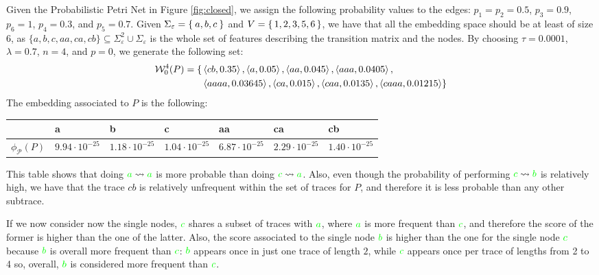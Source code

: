 \begin{example}
Given the Probabilistic Petri Net in Figure \ref{fig:closed}, we assign the following probability values to the edges: $p_1=p_2=0.5$, $p_3=0.9$, $p_6=1$, $p_4=0.3$, and $p_5=0.7$. Given $\Sigma_\varepsilon=\Set{a,b,c}$ and $V=\set{1,2,3,5,6}$, we have that all the embedding space should be at least of size $6$, as $\{a,b,c,aa,ca,cb\}\subseteq \Sigma_\varepsilon^2\cup\Sigma_\varepsilon$ is the whole set of features describing the transition matrix and the nodes. By choosing $\tau=0.0001$, $\lambda=0.7$, $n=4$, and $p=0$, we generate the following set:
$$\begin{aligned}
\mathcal{W}_0^4(P)=\{&\braket{cb,0.35},\braket{a,0.05},\braket{aa,0.045},\braket{aaa,0.0405},\\
&\braket{aaaa,0.03645},\braket{ca,0.015},\braket{caa,0.0135},\braket{caaa,0.01215}\}\\
\end{aligned}$$
The embedding associated to $P$ is the following:
\begin{center}
		\begin{tabular}{l|l|l|l|l|l|l|}
		\toprule
		& a    & b                                                   & c    & aa   & ca   & cb   \\
		\midrule
		$\phi_{\mathcal{P}}(P)$ & $9.94\cdot10^{-25}$ & $1.18\cdot 10^{-25}$ & $1.04\cdot10^{-25}$ & $6.87\cdot 10^{-25}$ & $2.29\cdot10^{-25}$ & $1.40\cdot10^{-25}$\\
		\bottomrule
	\end{tabular}
\end{center}
This table shows that doing ${\color{green}a}\rightsquigarrow{\color{green}a}$ is more probable than doing  ${\color{green}c}\rightsquigarrow{\color{green}a}$. Also, even though the probability of performing  ${\color{green}c}\rightsquigarrow{\color{green}b}$ is relatively high, we have that the trace $cb$ is relatively unfrequent within the set of traces for $P$, and therefore it is less probable than any other subtrace. 

If we now consider now the single nodes, $\color{green}c$ shares a subset of traces with $\color{green}a$, where $\color{green}a$ is more frequent than $\color{green}c$, and therefore the score of the former is higher than the one of the latter. Also, the score associated to the single node $\color{green}b$ is higher than the one for the single node $\color{green}c$ because $\color{green}b$ is overall more frequent than $\color{green}c$:  $\color{green}b$ appears once in just one trace of length $2$, while $\color{green}c$ appears once per trace of lengths from 2 to 4 so, overall, $\color{green}b$ is considered more frequent than $\color{green}c$.
\end{example}

